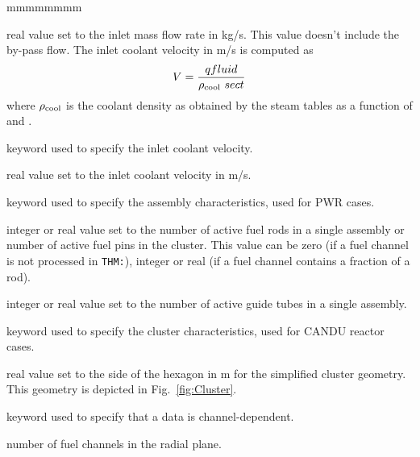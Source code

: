 \begin{ListeDeDescription}{mmmmmmmm}
\item[\dusa{qfluid}] real value set to the inlet mass flow rate in kg/s. This value doesn't include the by-pass flow.
The inlet coolant velocity in m/s is computed as $$V={{\sl qfluid} \over \rho_{\rm cool} \ {\sl sect}}$$
\noindent where $\rho_{\rm cool}$ is the coolant density as obtained by the steam tables as a function of  and .

\item[\moc{SPEED}] keyword used to specify the inlet coolant velocity.

\item[\dusa{velocity}] real value set to the inlet coolant velocity in m/s.

\item[\moc{ASSMB}] keyword used to specify the assembly characteristics, used for PWR cases.

\item[\dusa{nbf}] integer or real value set to the number of active fuel rods in a single assembly or number of active fuel pins in the cluster. This value
can be zero (if a fuel channel is not processed in {\tt THM:}), integer or real (if a fuel channel contains a fraction of a rod).

\item[\dusa{nbg}] integer or real value set to the number of active guide tubes in a single assembly.

\item[\moc{CLUSTER}] keyword used to specify the cluster characteristics, used for CANDU reactor cases.

\item[\dusa{pitch}] real value set to the side of the hexagon in m for the simplified cluster geometry. This geometry is depicted in Fig.~\ref{fig:Cluster}.

\item[\moc{CHAN}] keyword used to specify that a data is channel-dependent.

\item[\dusa{nch}] number of fuel channels in the radial plane.


\end{ListeDeDescription}
